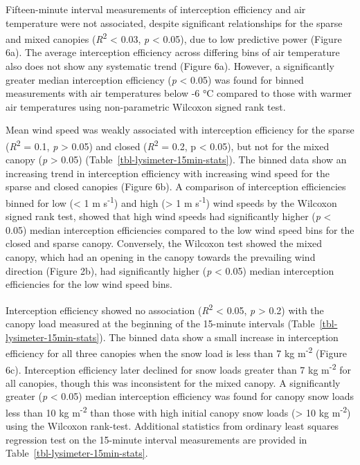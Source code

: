 \documentclass[
  letterpaper,
  DIV=11,
  numbers=noendperiod]{scrartcl}
\begin{document}
Fifteen-minute interval measurements of interception efficiency and air
temperature were not associated, despite significant relationships for
the sparse and mixed canopies (\emph{R}\textsuperscript{2} \textless{}
0.03, \emph{p} \textless{} 0.05), due to low predictive power (Figure
6a). The average interception efficiency across differing bins of air
temperature also does not show any systematic trend (Figure 6a).
However, a significantly greater median interception efficiency
(\emph{p} \textless{} 0.05) was found for binned measurements with air
temperatures below -6 °C compared to those with warmer air temperatures
using non-parametric Wilcoxon signed rank test.

Mean wind speed was weakly associated with interception efficiency for
the sparse (\emph{R}\textsuperscript{2} = 0.1, \emph{p} \textgreater{}
0.05) and closed (\emph{R}\textsuperscript{2} = 0.2, p \textless{}
0.05), but not for the mixed canopy (\emph{p} \textgreater{} 0.05)
(Table~\ref{tbl-lysimeter-15min-stats}). The binned data show an
increasing trend in interception efficiency with increasing wind speed
for the sparse and closed canopies (Figure 6b). A comparison of
interception efficiencies binned for low (\textless{} 1 m
s\textsuperscript{-1}) and high (\textgreater{} 1 m
s\textsuperscript{-1}) wind speeds by the Wilcoxon signed rank test,
showed that high wind speeds had significantly higher (\emph{p}
\textless{} 0.05) median interception efficiencies compared to the low
wind speed bins for the closed and sparse canopy. Conversely, the
Wilcoxon test showed the mixed canopy, which had an opening in the
canopy towards the prevailing wind direction (Figure 2b), had
significantly higher (\emph{p} \textless{} 0.05) median interception
efficiencies for the low wind speed bins.

Interception efficiency showed no association
(\emph{R}\textsuperscript{2} \textless{} 0.05, \emph{p} \textgreater{}
0.2) with the canopy load measured at the beginning of the 15-minute
intervals (Table~\ref{tbl-lysimeter-15min-stats}). The binned data show
a small increase in interception efficiency for all three canopies when
the snow load is less than 7 kg m\textsuperscript{-2} (Figure 6c).
Interception efficiency later declined for snow loads greater than 7 kg
m\textsuperscript{-2} for all canopies, though this was inconsistent for
the mixed canopy. A significantly greater (\emph{p} \textless{} 0.05)
median interception efficiency was found for canopy snow loads less than
10 kg m\textsuperscript{-2} than those with high initial canopy snow
loads (\textgreater{} 10 kg m\textsuperscript{-2}) using the Wilcoxon
rank-test. Additional statistics from ordinary least squares regression
test on the 15-minute interval measurements are provided in
Table~\ref{tbl-lysimeter-15min-stats}.
\end{document}
